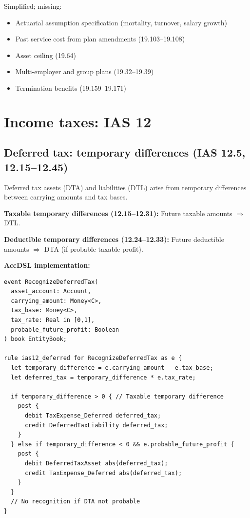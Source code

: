  Simplified; missing:
\begin{itemize}
\item Actuarial assumption specification (mortality, turnover, salary growth)
\item Past service cost from plan amendments (19.103--19.108)
\item Asset ceiling (19.64)
\item Multi-employer and group plans (19.32--19.39)
\item Termination benefits (19.159--19.171)
\end{itemize}

\section{Income taxes: IAS 12}

\subsection{Deferred tax: temporary differences (IAS 12.5, 12.15--12.45)}

Deferred tax assets (DTA) and liabilities (DTL) arise from temporary differences
between carrying amounts and tax bases.

\textbf{Taxable temporary differences (12.15--12.31):} Future taxable amounts
$\Rightarrow$ DTL.

\textbf{Deductible temporary differences (12.24--12.33):} Future deductible amounts
$\Rightarrow$ DTA (if probable taxable profit).

\textbf{AccDSL implementation:}

\begin{lstlisting}
event RecognizeDeferredTax(
  asset_account: Account,
  carrying_amount: Money<C>,
  tax_base: Money<C>,
  tax_rate: Real in [0,1],
  probable_future_profit: Boolean
) book EntityBook;

rule ias12_deferred for RecognizeDeferredTax as e {
  let temporary_difference = e.carrying_amount - e.tax_base;
  let deferred_tax = temporary_difference * e.tax_rate;

  if temporary_difference > 0 { // Taxable temporary difference
    post {
      debit TaxExpense_Deferred deferred_tax;
      credit DeferredTaxLiability deferred_tax;
    }
  } else if temporary_difference < 0 && e.probable_future_profit {
    post {
      debit DeferredTaxAsset abs(deferred_tax);
      credit TaxExpense_Deferred abs(deferred_tax);
    }
  }
  // No recognition if DTA not probable
}
\end{lstlisting}

